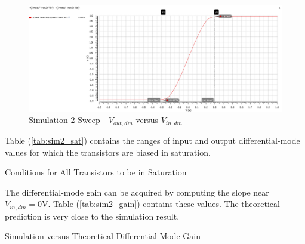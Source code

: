\FloatBarrier

\begin{figure}[h!]
	\centering
	\includegraphics[scale=0.75]{../images/sim2_sweep.PNG}
	\caption{Simulation 2 Sweep - $V_{out,dm}$ versus $V_{in,dm}$}
	\label{fig:sim2_sweep}
\end{figure}

\FloatBarrier

Table (\ref{tab:sim2_sat}) contains the ranges of input and output differential-mode values for which the transistors are biased in saturation.

\FloatBarrier

\begin{table}[h!]
	\centering
	\caption{Conditions for All Transistors to be in Saturation}
	\label{tab:sim2_sat}
\end{table}

\FloatBarrier

The differential-mode gain can be acquired by computing the slope near $V_{in,dm} = 0$\si{\volt}.
Table (\ref{tab:sim2_gain}) contains these values.
The theoretical prediction is very close to the simulation result.

\FloatBarrier

\begin{table}[h!]
	\centering
	\caption{Simulation versus Theoretical Differential-Mode Gain}
	\label{tab:sim2_gain}
\end{table}

\FloatBarrier
